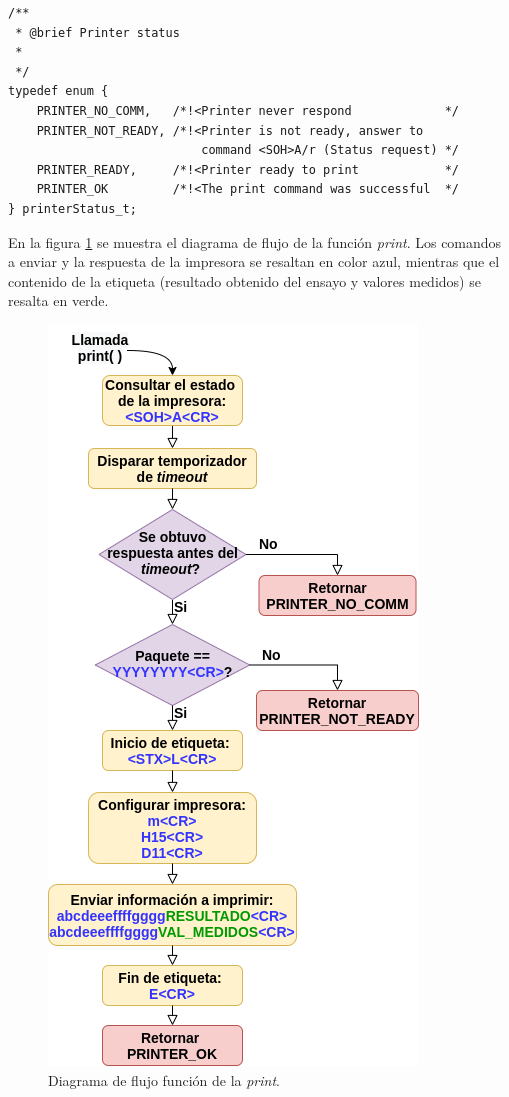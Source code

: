  \begin{lstlisting}[label=cod:print_h,caption=Prototipo función print.]
/**
 * @brief Printer status
 * 
 */
typedef enum {
	PRINTER_NO_COMM,   /*!<Printer never respond             */
	PRINTER_NOT_READY, /*!<Printer is not ready, answer to 
	                       command <SOH>A/r (Status request) */
	PRINTER_READY,     /*!<Printer ready to print            */
	PRINTER_OK         /*!<The print command was successful  */
} printerStatus_t;
\end{lstlisting}

En la figura \ref{fig:printFunc} se muestra el diagrama de flujo de la función \textit{print}. Los comandos a enviar y la respuesta de la impresora se resaltan en color azul, mientras que el contenido de la etiqueta (resultado obtenido del ensayo y valores medidos) se resalta en verde.

\pagebreak

\begin{figure}[htpb]
	\centering
	\includegraphics[scale=0.95]{./Figures/printer.png}
	\caption{Diagrama de flujo función de la \textit{print}.}
	\label{fig:printFunc}
\end{figure}

